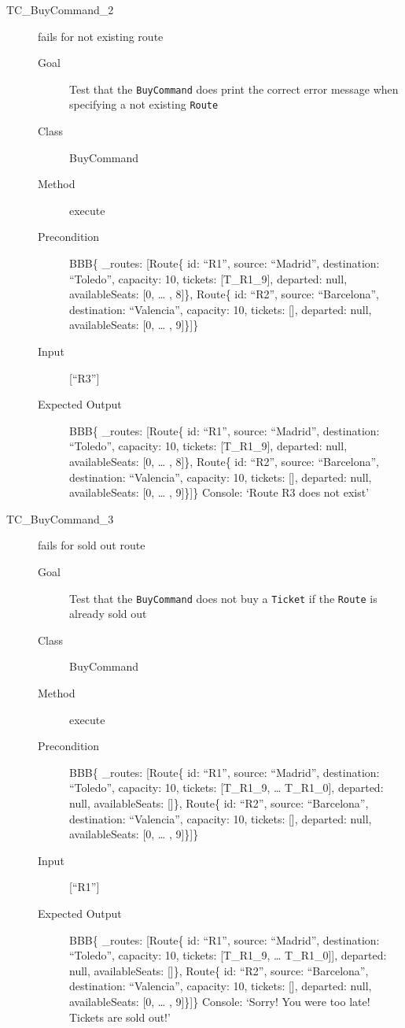 \documentclass[11pt]{article}
\begin{document}
\begin{description}
\item[{TC\_BuyCommand\_2}] fails for not existing route
\begin{description}
\item[{Goal}] Test that the \texttt{BuyCommand} does print the correct error message when specifying a not existing \texttt{Route}
\item[{Class}] BuyCommand
\item[{Method}] execute
\item[{Precondition}] BBB\{ \_routes: [Route\{ id: “R1”, source: “Madrid”, destination: “Toledo”, capacity: 10,  tickets: [T\_R1\_9], departed: null, availableSeats: [0, … , 8]\}, Route\{ id: “R2”, source: “Barcelona”, destination: “Valencia”, capacity: 10,  tickets: [], departed: null, availableSeats: [0, … , 9]\}]\}
\item[{Input}] [“R3”]
\item[{Expected Output}] BBB\{ \_routes: [Route\{ id: “R1”, source: “Madrid”, destination: “Toledo”, capacity: 10,  tickets: [T\_R1\_9], departed: null, availableSeats: [0, … , 8]\}, Route\{ id: “R2”, source: “Barcelona”, destination: “Valencia”, capacity: 10,  tickets: [], departed: null, availableSeats: [0, … , 9]\}]\}
Console: ‘Route R3 does not exist’
\end{description}
\end{description}


\begin{description}
\item[{TC\_BuyCommand\_3}] fails for sold out route
\begin{description}
\item[{Goal}] Test that the \texttt{BuyCommand} does not buy a \texttt{Ticket} if the \texttt{Route} is already sold out
\item[{Class}] BuyCommand
\item[{Method}] execute
\item[{Precondition}] BBB\{ \_routes: [Route\{ id: “R1”, source: “Madrid”, destination: “Toledo”, capacity: 10,  tickets: [T\_R1\_9, … T\_R1\_0], departed: null, availableSeats: []\}, Route\{ id: “R2”, source: “Barcelona”, destination: “Valencia”, capacity: 10,  tickets: [], departed: null, availableSeats: [0, … , 9]\}]\}
\item[{Input}] [“R1”]
\item[{Expected Output}] BBB\{ \_routes: [Route\{ id: “R1”, source: “Madrid”, destination: “Toledo”, capacity: 10,  tickets: [T\_R1\_9, … T\_R1\_0]], departed: null, availableSeats: []\}, Route\{ id: “R2”, source: “Barcelona”, destination: “Valencia”, capacity: 10,  tickets: [], departed: null, availableSeats: [0, … , 9]\}]\}
Console: ‘Sorry! You were too late! Tickets are sold out!’
\end{description}
\end{description}
\end{document}
